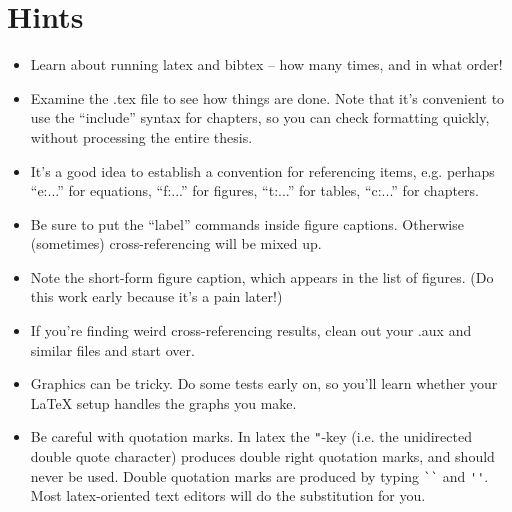 \chapter{\label{a:hints}Hints}

\begin{itemize}


	\item Learn about running latex and bibtex -- how many times, and in what order!

 \item Examine the .tex file to see how things are done. Note that it's convenient to use the ``include''
syntax for chapters, so you can check formatting quickly, without processing the entire thesis.

	\item It's a good idea to establish a convention for referencing items, e.g. perhaps ``e:...'' for
equations, ``f:...'' for figures, ``t:...'' for tables, ``c:...'' for chapters.

	\item Be sure to put the ``label'' commands inside figure captions. Otherwise (sometimes) cross-referencing will be mixed up.
	
	\item Note the short-form figure caption, which appears in the list of figures.  (Do this work early because it's a pain later!)
	
	\item If you're finding weird cross-referencing results, clean out your .aux and similar files and start over.

 	\item Graphics can be tricky. Do some tests early on, so you'll learn whether your LaTeX setup
    handles the graphs you make. 

  \item Be careful with quotation marks. In latex the \verb|"|-key
    (i.e. the unidirected double quote character) produces double
    right quotation marks, and should never be used. Double quotation
    marks are produced by typing \verb|``| and \verb|''|. Most
    latex-oriented text editors will do the substitution for you.

\end{itemize}
